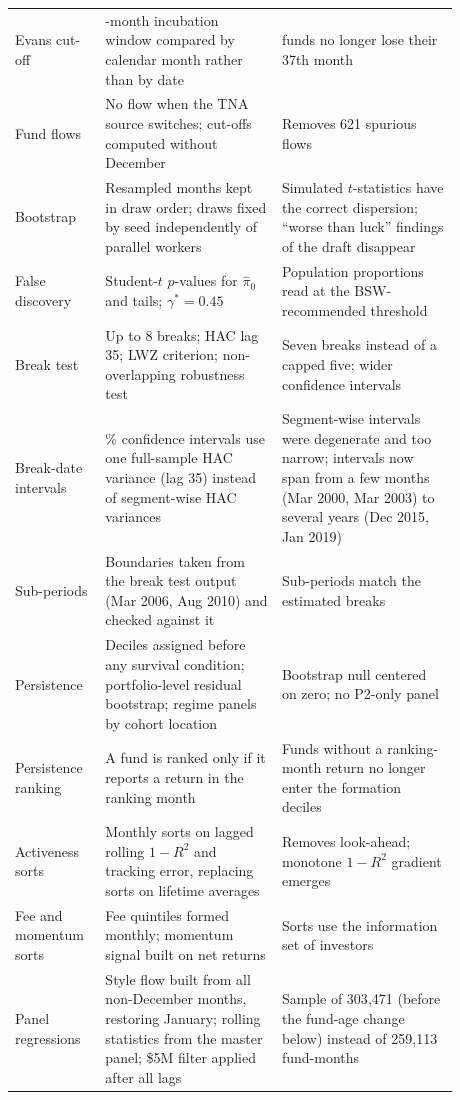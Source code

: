 \documentclass[12pt, oneside]{report}
\begin{document}
{\begin{longtable}{>{\raggedright\arraybackslash}p{0.16\linewidth}>{\raggedright\arraybackslash}p{0.36\linewidth}>{\raggedright\arraybackslash}p{0.36\linewidth}}
Evans cut-off & 36-month incubation window compared by calendar month rather than by date & 201 funds no longer lose their 37th month \\
Fund flows & No flow when the TNA source switches; cut-offs computed without December & Removes 621 spurious flows \\
Bootstrap & Resampled months kept in draw order; draws fixed by seed independently of parallel workers & Simulated $t$-statistics have the correct dispersion; ``worse than luck'' findings of the draft disappear \\
False discovery & Student-$t$ $p$-values for $\hat{\pi}_0$ and tails; $\gamma^* = 0.45$ & Population proportions read at the BSW-recommended threshold \\
Break test & Up to 8 breaks; HAC lag 35; LWZ criterion; non-overlapping robustness test & Seven breaks instead of a capped five; wider confidence intervals \\
Break-date intervals & 95\% confidence intervals use one full-sample HAC variance (lag 35) instead of segment-wise HAC variances & Segment-wise intervals were degenerate and too narrow; intervals now span from a few months (Mar 2000, Mar 2003) to several years (Dec 2015, Jan 2019) \\
Sub-periods & Boundaries taken from the break test output (Mar 2006, Aug 2010) and checked against it & Sub-periods match the estimated breaks \\
Persistence & Deciles assigned before any survival condition; portfolio-level residual bootstrap; regime panels by cohort location & Bootstrap null centered on zero; no P2-only panel \\
Persistence ranking & A fund is ranked only if it reports a return in the ranking month & Funds without a ranking-month return no longer enter the formation deciles \\
Activeness sorts & Monthly sorts on lagged rolling $1-R^2$ and tracking error, replacing sorts on lifetime averages & Removes look-ahead; monotone $1-R^2$ gradient emerges \\
Fee and momentum sorts & Fee quintiles formed monthly; momentum signal built on net returns & Sorts use the information set of investors \\
Panel regressions & Style flow built from all non-December months, restoring January; rolling statistics from the master panel; \$5M filter applied after all lags & Sample of 303{,}471 (before the fund-age change below) instead of 259{,}113 fund-months \\

\end{longtable}}
\end{document}
